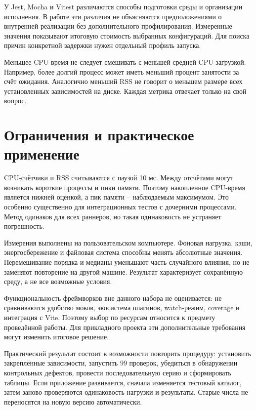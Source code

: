 У Jest, Mocha и Vitest различаются способы подготовки среды и организации исполнения. В работе эти различия не объясняются предположениями о внутренней реализации без дополнительного профилирования. Измеренные значения показывают итоговую стоимость выбранных конфигураций. Для поиска причин конкретной задержки нужен отдельный профиль запуска.

Меньшее CPU-время не следует смешивать с меньшей средней CPU-загрузкой. Например, более долгий процесс может иметь меньший процент занятости за счёт ожидания. Аналогично меньший RSS не говорит о меньшем размере всех установленных зависимостей на диске. Каждая метрика отвечает только на свой вопрос.

\section{Ограничения и практическое применение}
CPU-счётчики и RSS считываются с паузой 10 мс. Между отсчётами могут возникать короткие процессы и пики памяти. Поэтому накопленное CPU-время является нижней оценкой, а пик памяти -- наблюдаемым максимумом. Это особенно существенно для интеграционных тестов с дочерними процессами. Метод одинаков для всех раннеров, но такая одинаковость не устраняет погрешность.

Измерения выполнены на пользовательском компьютере. Фоновая нагрузка, кэши, энергосбережение и файловая система способны менять абсолютные значения. Перемешивание порядка и медианы уменьшают часть случайного влияния, но не заменяют повторение на другой машине. Результат характеризует сохранённую среду, а не все возможные условия.

Функциональность фреймворков вне данного набора не оценивается: не сравниваются удобство моков, экосистема плагинов, watch-режим, coverage и интеграция с Vite. Поэтому выбор по ресурсам относится к предмету проведённой работы. Для прикладного проекта эти дополнительные требования могут изменить итоговое решение.

Практический результат состоит в возможности повторить процедуру: установить закреплённые зависимости, запустить 99 проверок, убедиться в обнаружении контрольных дефектов, провести последовательную серию и сформировать таблицы. Если приложение развивается, сначала изменяется тестовый каталог, затем заново проверяются одинаковость нагрузки и результаты. Старые числа не переносятся на новую версию автоматически.

